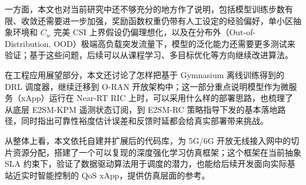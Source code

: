 一方面，本文也对当前研究中还不够充分的地方作了说明，包括模型训练步数有限、收敛还需要进一步加强，奖励函数权重仍带有人工设定的经验偏好，单小区抽象环境和 \(C_w\) 完美 CSI 上界假设仍偏理想化，以及在分布外（Out-of-Distribution, OOD）极端高负载突发流量下，模型的泛化能力还需要更多测试来验证；基于这些问题，后续可以从课程学习、多目标优化等方向继续改进算法。

在工程应用展望部分，本文还讨论了怎样把基于 Gymnasium 离线训练得到的 DRL 调度器，继续迁移到 O-RAN 开放架构中；这一部分重点说明模型作为微服务（xApp）运行在 Near-RT RIC 上时，可以采用什么样的部署思路，也梳理了从底层 E2SM-KPM 遥测状态订阅，到 E2SM-RC 策略指导下发的基本落地路径，同时指出可靠性裕度估计误差和反馈时延都会给真实部署带来挑战。

从整体上看，本文依托自建并扩展后的代码库，为 5G/6G 开放无线接入网中的切片资源分配，搭建了一个可以复现的深度强化学习仿真框架；这个框架在当前抽象 SLA 约束下，验证了数据驱动算法用于调度的潜力，也能给后续开发面向实际基站近实时智能控制的 QoS xApp，提供仿真层面的参考。








